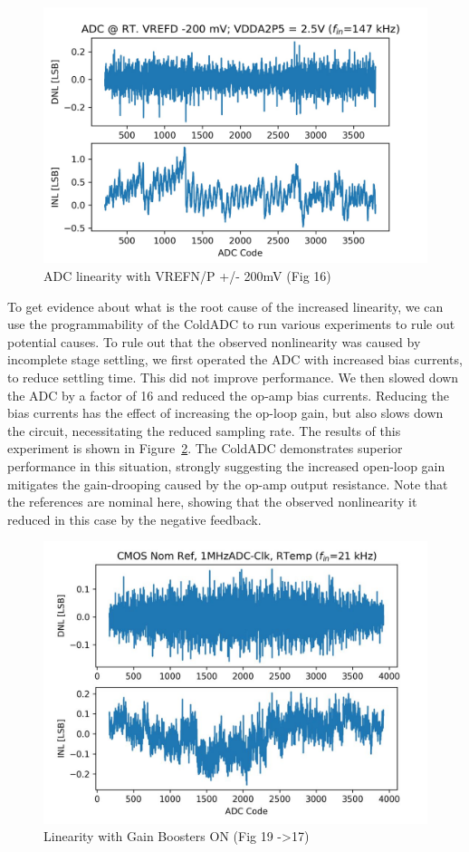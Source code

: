 \begin{figure}[h!]
\centering
  \includegraphics[width=0.7\linewidth]{figures/prakash_fig/linearity_200mv.JPG}
  \caption{ADC linearity with VREFN/P +/- 200mV (Fig 16)}
  \label{fig:linearity_200mv}
\end{figure}


To get evidence about what is the root cause of the increased linearity, we can use the programmability of the ColdADC to run various experiments to rule out potential causes. To rule out that the observed nonlinearity was caused by incomplete stage settling, we first operated the ADC with increased bias currents, to reduce settling time. This did not improve performance. We then slowed down the ADC by a factor of 16 and reduced the op-amp bias currents. Reducing the bias currents has the effect of increasing the op-loop gain, but also slows down the circuit, necessitating the reduced sampling rate. 
The results of this experiment is shown in Figure~\ref{fig:linearity_GB_ON}. The ColdADC demonstrates superior performance in this situation, strongly suggesting the increased open-loop gain mitigates the gain-drooping caused by the op-amp output resistance. Note that the references are nominal here, showing that the observed nonlinearity it reduced in this case by the negative feedback.

\begin{figure}[h!]
\centering
  \includegraphics[width=0.6\linewidth]{figures/prakash_fig/linearity_GB_ON.JPG}
  \caption{Linearity with Gain Boosters ON (Fig 19 ->17)}
  \label{fig:linearity_GB_ON}
\end{figure}


